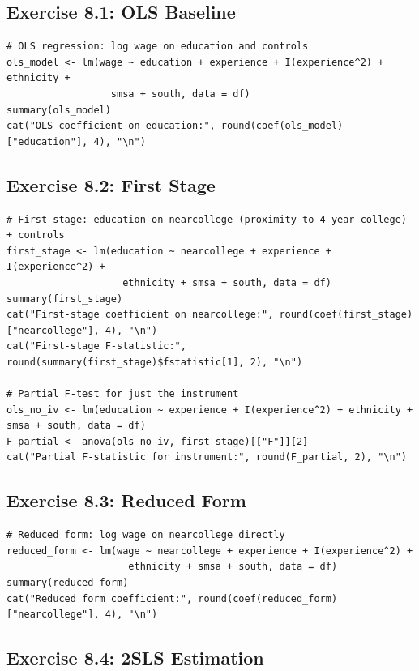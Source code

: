 \subsection{Exercise 8.1: OLS Baseline}

\begin{lstlisting}
# OLS regression: log wage on education and controls
ols_model <- lm(wage ~ education + experience + I(experience^2) + ethnicity + 
                  smsa + south, data = df)
summary(ols_model)
cat("OLS coefficient on education:", round(coef(ols_model)["education"], 4), "\n")
\end{lstlisting}

\subsection{Exercise 8.2: First Stage}

\begin{lstlisting}
# First stage: education on nearcollege (proximity to 4-year college) + controls
first_stage <- lm(education ~ nearcollege + experience + I(experience^2) + 
                    ethnicity + smsa + south, data = df)
summary(first_stage)
cat("First-stage coefficient on nearcollege:", round(coef(first_stage)["nearcollege"], 4), "\n")
cat("First-stage F-statistic:", round(summary(first_stage)$fstatistic[1], 2), "\n")

# Partial F-test for just the instrument
ols_no_iv <- lm(education ~ experience + I(experience^2) + ethnicity + smsa + south, data = df)
F_partial <- anova(ols_no_iv, first_stage)[["F"]][2]
cat("Partial F-statistic for instrument:", round(F_partial, 2), "\n")
\end{lstlisting}

\subsection{Exercise 8.3: Reduced Form}

\begin{lstlisting}
# Reduced form: log wage on nearcollege directly
reduced_form <- lm(wage ~ nearcollege + experience + I(experience^2) + 
                     ethnicity + smsa + south, data = df)
summary(reduced_form)
cat("Reduced form coefficient:", round(coef(reduced_form)["nearcollege"], 4), "\n")
\end{lstlisting}

\subsection{Exercise 8.4: 2SLS Estimation}

